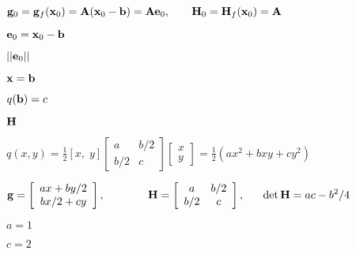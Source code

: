 \documentclass{article}
\def\lthtmlcheckvsize{\ifdim\ht\sizebox<\vsize 
  \ifdim\wd\sizebox<\hsize\expandafter\hfill\fi \expandafter\vfill
  \else\expandafter\vss\fi}%
\begin{document}
{\newpage\clearpage
{}%
$\displaystyle {\bf g}_0={\bf g}_f({\bf x}_0)={\bf A}({\bf x}_0-{\bf b})={\bf A}{\bf e}_0,
\;\;\;\;\;\;\;
{\bf H}_0={\bf H}_f({\bf x}_0)={\bf A}$%
\lthtmlindisplaymathZ
\lthtmlcheckvsize\clearpage}

{\newpage\clearpage
{}%
$ {\bf e}_0={\bf x}_0-{\bf b}$%
\lthtmlindisplaymathZ
\lthtmlcheckvsize\clearpage}

{\newpage\clearpage
{}%
$ ||{\bf e}_0||$%
\lthtmlindisplaymathZ
\lthtmlcheckvsize\clearpage}

{\newpage\clearpage
{}%
$ {\bf x}={\bf b}$%
\lthtmlindisplaymathZ
\lthtmlcheckvsize\clearpage}

{\newpage\clearpage
{}%
$ q({\bf b})=c$%
\lthtmlindisplaymathZ
\lthtmlcheckvsize\clearpage}

{\newpage\clearpage
{}%
$ {\bf H}$%
\lthtmlindisplaymathZ
\lthtmlcheckvsize\clearpage}

{\newpage\clearpage
{}%
$\displaystyle q(x,y)=\frac{1}{2} [x,\;y]\left[\begin{array}{cc}a&b/2\\b/2&c\end{array}\right]
\left[\begin{array}{c}x\\y\end{array}\right]=\frac{1}{2}(ax^2+bxy+cy^2)$%
\lthtmlindisplaymathZ
\lthtmlcheckvsize\clearpage}

{\newpage\clearpage
{}%
$\displaystyle {\bf g}=\left[\begin{array}{c}ax+by/2\\bx/2+cy\end{array}\right],
\;\;\;\;\;\;\;\;\;\;\;\;\;\;
{\bf H}=\left[\begin{array}{cc}a&b/2\\b/2&c\end{array}\right],
\;\;\;\;\;\;\det{\bf H}=ac-b^2/4$%
\lthtmlindisplaymathZ
\lthtmlcheckvsize\clearpage}

{\newpage\clearpage
{}%
$ a=1$%
\lthtmlindisplaymathZ
\lthtmlcheckvsize\clearpage}

{\newpage\clearpage
{}%
$ c=2$%
\lthtmlindisplaymathZ
\lthtmlcheckvsize\clearpage}
\end{document}
